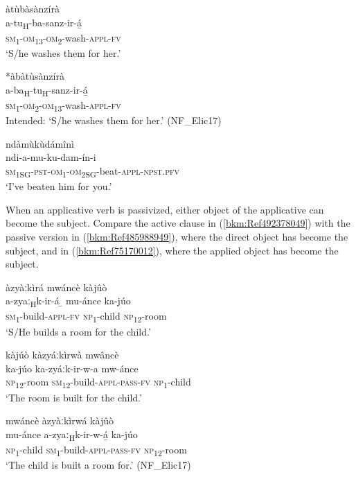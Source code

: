 \ea
\label{bkm:Ref75169895}
\glll àtùbàsànzírà\\
a-tu\textsubscript{H}-ba-sanz-ir-á̲\\
\textsc{sm}\textsubscript{1}-\textsc{om}\textsubscript{13}-\textsc{om}\textsubscript{2}-wash-\textsc{appl}-\textsc{fv}\\
\glt ‘S/he washes them for her.’
\z

\ea
\label{bkm:Ref75169896}
*àbàtùsànzírà\\
a-ba\textsubscript{H}-tu\textsubscript{H}-sanz-ir-á̲\\
\textsc{sm}\textsubscript{1}-\textsc{om}\textsubscript{2}-\textsc{om}\textsubscript{13}-wash-\textsc{appl}-\textsc{fv}\\
Intended: ‘S/he washes them for her.’ (NF\_Elic17)
\z

\ea
\label{bkm:Ref98836118}
\glll ndàmùkùdámînì\\
ndi-a-mu-ku-dam-ín-i\\
\textsc{sm}\textsubscript{1SG}-\textsc{pst}-\textsc{om}\textsubscript{1}-\textsc{om}\textsubscript{2SG}-beat-\textsc{appl}-\textsc{npst}.\textsc{pfv}\\
\glt ‘I’ve beaten him for you.’
\z

When an applicative verb is passivized, either object of the applicative can become the subject. Compare the active clause in (\ref{bkm:Ref492378049}) with the passive version in (\ref{bkm:Ref485988949}), where the direct object has become the subject, and in (\ref{bkm:Ref75170012}), where the applied object has become the subject.

\ea
\label{bkm:Ref492378049}
àzyàːkìrá mwáncè kàjûò\\
\gll a-zyaː\textsubscript{H}k-ir-á  ̲  mu-ánce  ka-júo\\
\textsc{sm}\textsubscript{1}-build-\textsc{appl}-\textsc{fv}  \textsc{np}\textsubscript{1}-child  \textsc{np}\textsubscript{12}-room\\
\glt ‘S/He builds a room for the child.’
\z

\ea
\label{bkm:Ref485988949}
kàjúò kàzyáːkìrwà mwâncè\\
\gll ka-júo    ka-zyáːk-ir-w-a    mw-ánce\\
\textsc{np}\textsubscript{12}-room  \textsc{sm}\textsubscript{12}-build-\textsc{appl}-\textsc{pass}-\textsc{fv}  \textsc{np}\textsubscript{1}-child\\
\glt ‘The room is built for the child.’
\z

\ea
\label{bkm:Ref75170012}
mwáncè àzyàːkìrwá kàjûò\\
\gll mu-ánce  a-zyaː\textsubscript{H}k-ir-w-á̲    ka-júo\\
\textsc{np}\textsubscript{1}-child  \textsc{sm}\textsubscript{1}-build-\textsc{appl}-\textsc{pass}-\textsc{fv}  \textsc{np}\textsubscript{12}-room\\
\glt ‘The child is built a room for.’ (NF\_Elic17)
\z

